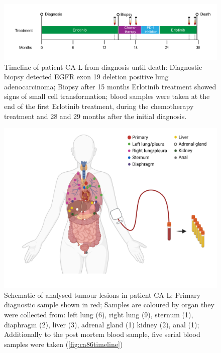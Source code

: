 \begin{figure}[ht]
\centering
\includegraphics[width=.99\linewidth]{Figures/CASCADE/CA86/CA-L_timeline}
\caption[Timeline of patient CA-L from diagnosis until death]{Timeline of patient CA-L from diagnosis until death: Diagnostic biopsy detected EGFR exon 19 deletion positive lung adenocarcinoma;  Biopsy after 15 months Erlotinib treatment showed signs of small cell transformation; blood samples were taken at the end of the first Erlotinib treatment, during the chemotherapy treatment and  28 and 29 months after the initial diagnosis.} \label{fig:ca86timeline}
\end{figure}





\begin{figure}[ht]
\centering
\includegraphics[width=.99\linewidth]{Figures/CASCADE/CA86/CA-L_schematic_CA86_organColours}
\caption[Schematic of analysed tumour lesions in patient CA-L]{Schematic of analysed tumour lesions in patient CA-L: Primary diagnostic sample shown in red; Samples are coloured by organ they were collected from: left lung (6), right lung (9), sternum (1), diaphragm (2), liver (3), adrenal gland (1) kidney (2), anal (1); Additionally to the post mortem blood sample, five serial blood samples were taken (\protect\autoref{fig:ca86timeline})} \label{fig:ca86schematic}
\end{figure}

